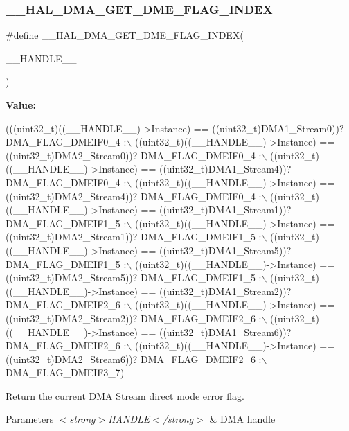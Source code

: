 \subsubsection{\texorpdfstring{\+\_\+\+\_\+\+H\+A\+L\+\_\+\+D\+M\+A\+\_\+\+G\+E\+T\+\_\+\+D\+M\+E\+\_\+\+F\+L\+A\+G\+\_\+\+I\+N\+D\+EX}{\_\_HAL\_DMA\_GET\_DME\_FLAG\_INDEX}}
{\footnotesize\ttfamily \#define \+\_\+\+\_\+\+H\+A\+L\+\_\+\+D\+M\+A\+\_\+\+G\+E\+T\+\_\+\+D\+M\+E\+\_\+\+F\+L\+A\+G\+\_\+\+I\+N\+D\+EX(\begin{DoxyParamCaption}\item[{}]{\+\_\+\+\_\+\+H\+A\+N\+D\+L\+E\+\_\+\+\_\+ }\end{DoxyParamCaption})}

{\bfseries Value\+:}
\begin{DoxyCode}
(((uint32\_t)((\_\_HANDLE\_\_)->Instance) == ((uint32\_t)DMA1\_Stream0))? DMA\_FLAG\_DMEIF0\_4 :\(\backslash\)
 ((uint32\_t)((\_\_HANDLE\_\_)->Instance) == ((uint32\_t)DMA2\_Stream0))? DMA\_FLAG\_DMEIF0\_4 :\(\backslash\)
 ((uint32\_t)((\_\_HANDLE\_\_)->Instance) == ((uint32\_t)DMA1\_Stream4))? DMA\_FLAG\_DMEIF0\_4 :\(\backslash\)
 ((uint32\_t)((\_\_HANDLE\_\_)->Instance) == ((uint32\_t)DMA2\_Stream4))? DMA\_FLAG\_DMEIF0\_4 :\(\backslash\)
 ((uint32\_t)((\_\_HANDLE\_\_)->Instance) == ((uint32\_t)DMA1\_Stream1))? DMA\_FLAG\_DMEIF1\_5 :\(\backslash\)
 ((uint32\_t)((\_\_HANDLE\_\_)->Instance) == ((uint32\_t)DMA2\_Stream1))? DMA\_FLAG\_DMEIF1\_5 :\(\backslash\)
 ((uint32\_t)((\_\_HANDLE\_\_)->Instance) == ((uint32\_t)DMA1\_Stream5))? DMA\_FLAG\_DMEIF1\_5 :\(\backslash\)
 ((uint32\_t)((\_\_HANDLE\_\_)->Instance) == ((uint32\_t)DMA2\_Stream5))? DMA\_FLAG\_DMEIF1\_5 :\(\backslash\)
 ((uint32\_t)((\_\_HANDLE\_\_)->Instance) == ((uint32\_t)DMA1\_Stream2))? DMA\_FLAG\_DMEIF2\_6 :\(\backslash\)
 ((uint32\_t)((\_\_HANDLE\_\_)->Instance) == ((uint32\_t)DMA2\_Stream2))? DMA\_FLAG\_DMEIF2\_6 :\(\backslash\)
 ((uint32\_t)((\_\_HANDLE\_\_)->Instance) == ((uint32\_t)DMA1\_Stream6))? DMA\_FLAG\_DMEIF2\_6 :\(\backslash\)
 ((uint32\_t)((\_\_HANDLE\_\_)->Instance) == ((uint32\_t)DMA2\_Stream6))? DMA\_FLAG\_DMEIF2\_6 :\(\backslash\)
   DMA\_FLAG\_DMEIF3\_7)
\end{DoxyCode}


Return the current D\+MA Stream direct mode error flag. 


\begin{DoxyParams}{Parameters}
{\em $<$strong$>$\+H\+A\+N\+D\+L\+E$<$/strong$>$} & D\+MA handle \\
\hline
\end{DoxyParams}

